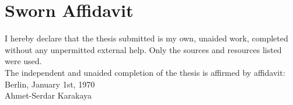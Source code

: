 
\cleardoublepage
\section*{Sworn Affidavit}

\begin{flushleft}
    I hereby declare that the thesis submitted is my own, unaided work, completed without any unpermitted external help. Only the sources and resources listed were used.\\
    \vspace{0.5cm}
    The independent and unaided completion of the thesis is affirmed by affidavit:\\
    \vspace{1.0cm}
    Berlin, January 1st, 1970
    \\
    \vspace{3.5cm}
    Ahmet-Serdar Karakaya
\end{flushleft}
